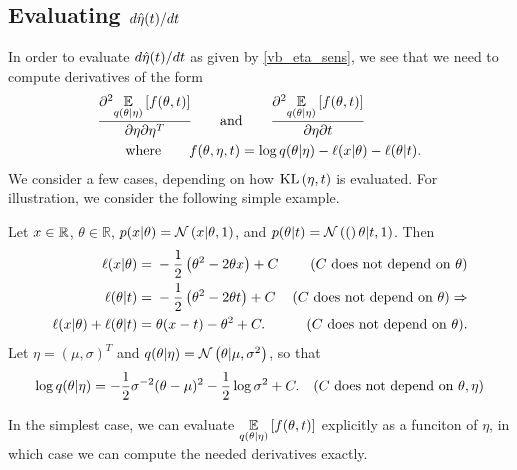 \subsection{Evaluating $d\hat\eta(t) / dt$}

In order to evaluate $d\hat\eta(t) / dt$ as given by \eqref{vb_eta_sens}, we
see that we need to compute derivatives of the form
%
\begin{align*}
%
&\frac{\partial^2
       \expect{\q(\theta \vert \eta)}{ f(\theta, \t) }}
      {\partial \eta \partial \eta^T}
\mathand
\frac{\partial^2 \expect{\q(\theta \vert \eta)}{f(\theta, \t)}}
      {\partial \eta \partial \t} \\
& \mathwhere
f(\theta, \eta, \t) =
    \log \q(\theta \vert \eta) - \logp(\x \vert \theta) - \logp(\theta \vert \t).
%
\end{align*}
%
We consider a few cases, depending on how $\mathrm{KL}\left(\eta, t\right)$ is evaluated.
For illustration, we consider the following simple example.

\begin{ex}
%
Let $x \in \mathbb{R}$, $\theta \in \mathbb{R}$, $p(x \vert \theta) = \mathcal{N}\left(x
\vert \theta, 1\right)$, and $p(\theta \vert t) = \mathcal{N}\left((\right)\theta \vert t, 1)$.  Then
%
\begin{align*}
%
\logp(\x \vert \theta) ={}&
    -\frac{1}{2} \left(\theta^2 - 2 \theta \x \right) + \const
    & \constdesc{\theta} \\
\logp(\theta \vert \t)={}&
    -\frac{1}{2} \left(\theta^2 - 2 \theta \t \right) + \const
    & \constdesc{\theta} \Rightarrow  \\
\logp(\x \vert \theta) + \logp(\theta \vert \t)={}&
    \theta(\x - \t) - \theta^2 + \const.
    & \constdesc{\theta}.
%
\end{align*}
%
Let $\eta = (\mu, \sigma)^T$ and $q(\theta \vert \eta) = \mathcal{N}\left(\theta \vert \mu,
\sigma^2\right)$, so that
%
\begin{align*}
%
\log \q(\theta \vert \eta) &=
    -\frac{1}{2} \sigma^{-2} (\theta - \mu)^2 -\frac{1}{2} \log \sigma^2 +
    \const.&\constdesc{\theta, \eta}
%
\end{align*}
%
\end{ex}

In the simplest case, we can evaluate $\underset{q(\theta \vert \eta)}{\mathbb{E}}\left[ f(\theta,
t) \right]$ explicitly as a funciton of $\eta$, in which case we can compute
the needed derivatives exactly.

